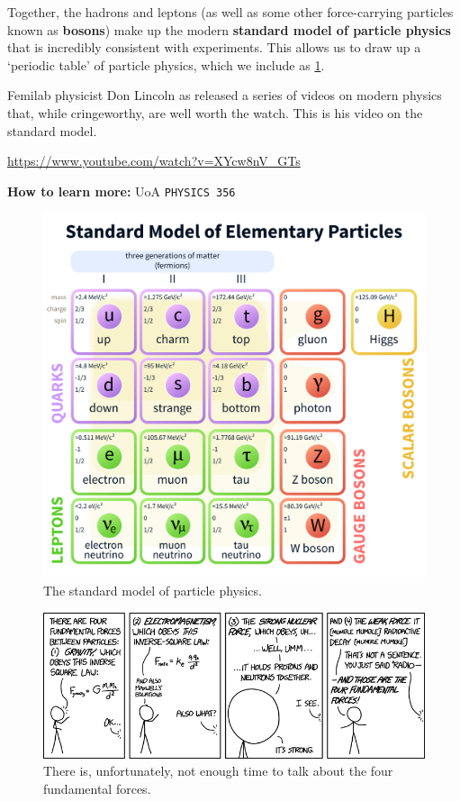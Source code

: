 \documentclass[a4paper]{amsbook}
\newcommand{\goandwatch}[1]{
\begin{center}
\begin{tcolorbox}[width=0.8\textwidth,colback={SkyBlue!20},title={\textbf{Go and watch...}},colbacktitle=MidnightBlue,coltitle=White]
  \textcolor{MidnightBlue}{\url{#1}}
\end{tcolorbox}
\end{center}}
\theoremstyle{definition}
\numberwithin{exercise}{chapter}
\numberwithin{exercise}{chapter}
\begin{document}
Together, the hadrons and leptons (as well as some other force-carrying particles known as \textbf{bosons}) make up the modern \textbf{standard
model of particle physics} that is incredibly consistent with experiments. This allows us to draw up a `periodic table' of particle
physics, which we include as \cref{fig:standardmodel}.

Femilab physicist Don Lincoln as released a series of videos on modern physics that, while cringeworthy, are well worth the watch. This is
his video on the standard model.
\goandwatch{https://www.youtube.com/watch?v=XYcw8nV_GTs}


\textbf{How to learn more: } UoA \texttt{PHYSICS 356}

\begin{figure}
  \centering
  \includegraphics[width=\textwidth]{standardmodel}
  \caption{The standard model of particle physics. \label{fig:standardmodel}}
\end{figure}

\begin{figure}
  \centering
  \includegraphics[width=\textwidth]{forces}
  \caption{There is, unfortunately, not enough time to talk about the four fundamental forces. \label{fig:forces}}
\end{figure}
\end{document}
